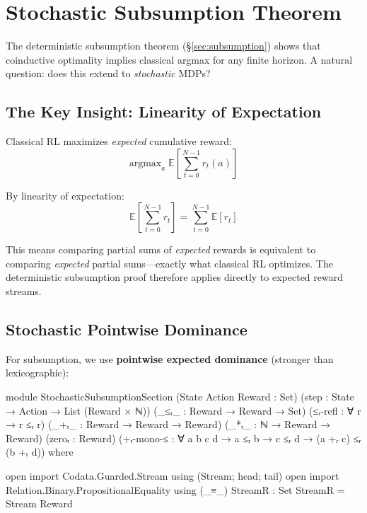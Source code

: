 \documentclass[9pt,a4paper]{article}
\theoremstyle{plain}
\theoremstyle{definition}
\theoremstyle{remark}
\begin{document}
\section{Stochastic Subsumption Theorem}
\label{sec:stoch-sub}

The deterministic subsumption theorem (\S\ref{sec:subsumption}) shows that coinductive optimality implies classical argmax for any finite horizon.  A natural question: does this extend to \emph{stochastic} MDPs?

\subsection{The Key Insight: Linearity of Expectation}

Classical RL maximizes \emph{expected} cumulative reward:
\[
\text{argmax}_a \; \mathbb{E}\left[\sum_{t=0}^{N-1} r_t(a)\right]
\]

By linearity of expectation:
\[
\mathbb{E}\left[\sum_{t=0}^{N-1} r_t\right] = \sum_{t=0}^{N-1} \mathbb{E}[r_t]
\]

This means comparing partial sums of \emph{expected} rewards is equivalent to comparing \emph{expected} partial sums---exactly what classical RL optimizes. The deterministic subsumption proof therefore applies directly to expected reward streams.

\subsection{Stochastic Pointwise Dominance}

For subsumption, we use \textbf{pointwise expected dominance} (stronger than lexicographic):

\begin{code}[hide]
module StochasticSubsumptionSection
  (State Action Reward : Set)
  (step : State → Action → List (Reward × ℕ))
  (_≤ᵣ_ : Reward → Reward → Set)
  (≤ᵣ-refl : ∀ {r} → r ≤ᵣ r)
  (_+ᵣ_ : Reward → Reward → Reward)
  (_*ᵣ_ : ℕ → Reward → Reward)
  (zeroᵣ : Reward)
  (+ᵣ-mono-≤ : ∀ {a b c d} → a ≤ᵣ b → c ≤ᵣ d → (a +ᵣ c) ≤ᵣ (b +ᵣ d))
  where

  open import Codata.Guarded.Stream using (Stream; head; tail)
  open import Relation.Binary.PropositionalEquality using (_≡_)
  StreamR : Set
  StreamR = Stream Reward
\end{code}
\end{document}
